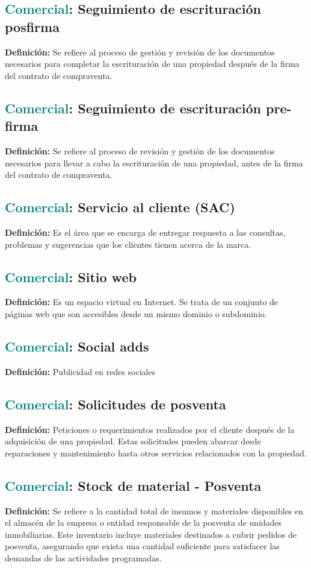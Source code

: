 \documentclass[12pt]{article}
\begin{document}
\subsection{\textcolor{teal}{Comercial}: Seguimiento de escrituración posfirma}
\textbf{Definición:} Se refiere al proceso de gestión y revisión de los documentos necesarios para completar la escrituración de una propiedad después de la firma del contrato de compraventa.
\subsection{\textcolor{teal}{Comercial}: Seguimiento de escrituración pre-firma}
\textbf{Definición:} Se refiere al proceso de revisión y gestión de los documentos necesarios para llevar a cabo la escrituración de una propiedad, antes de la firma del contrato de compraventa.
\subsection{\textcolor{teal}{Comercial}: Servicio al cliente (SAC)}
\textbf{Definición:} Es el área que se encarga de entregar respuesta a las consultas, problemas y sugerencias que los clientes tienen acerca de la marca.
\subsection{\textcolor{teal}{Comercial}: Sitio web}
\textbf{Definición:} Es un espacio virtual en Internet. Se trata de un conjunto de páginas web que son accesibles desde un mismo dominio o subdominio.
\subsection{\textcolor{teal}{Comercial}: Social adds}
\textbf{Definición:} Publicidad en redes sociales
\subsection{\textcolor{teal}{Comercial}: Solicitudes de posventa}
\textbf{Definición:} Peticiones o requerimientos realizados por el cliente después de la adquisición de una propiedad. Estas solicitudes pueden abarcar desde reparaciones y mantenimiento hasta otros servicios relacionados con la propiedad.
\subsection{\textcolor{teal}{Comercial}: Stock de material - Posventa}
\textbf{Definición:} Se refiere a la cantidad total de insumos y materiales disponibles en el almacén de la empresa o entidad responsable de la posventa de unidades inmobiliarias. Este inventario incluye materiales destinados a cubrir pedidos de posventa, asegurando que exista una cantidad suficiente para satisfacer las demandas de las actividades programadas.
\end{document}
